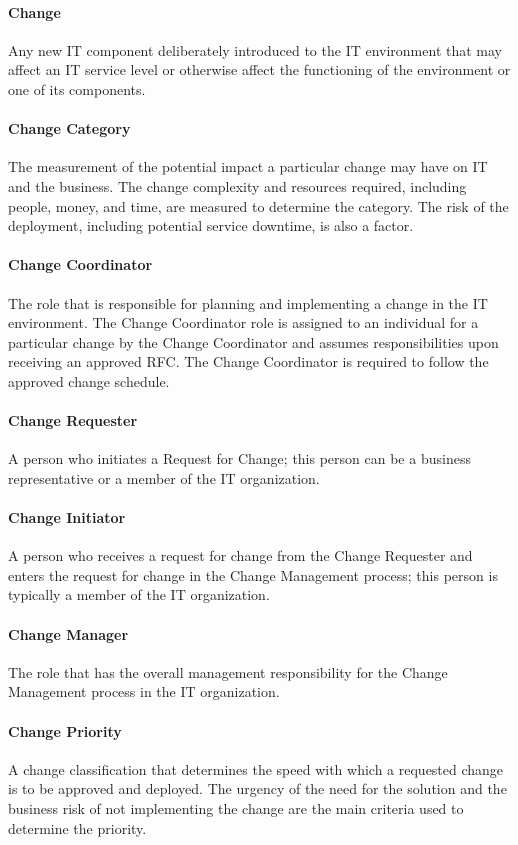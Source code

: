 \documentclass[8pt]{extarticle}
\begin{document}
\begin{multicols}{3}
    \paragraph{Change} Any new IT component deliberately introduced to the IT environment that may affect an IT
    service level or otherwise affect the functioning of the environment or one of its components.
    \paragraph{Change Category} The measurement of the potential impact a particular change may have on IT and the
    business. The change complexity and resources required, including people, money, and time, are
    measured to determine the category. The risk of the deployment, including potential service downtime, is
    also a factor.
    \paragraph{Change Coordinator} The role that is responsible for planning and implementing a change in the IT
    environment. The Change Coordinator role is assigned to an individual for a particular change by the
    Change Coordinator and assumes responsibilities upon receiving an approved RFC. The Change
    Coordinator is required to follow the approved change schedule.
    \paragraph{Change Requester} A person who initiates a Request for Change; this person can be a business
    representative or a member of the IT organization.
    \paragraph{Change Initiator} A person who receives a request for change from the Change Requester and enters
    the request for change in the Change Management process; this person is typically a member of the IT
    organization.
    \paragraph{Change Manager} The role that has the overall management responsibility for the Change Management
    process in the IT organization.
    \paragraph{Change Priority} A change classification that determines the speed with which a requested change is to
    be approved and deployed. The urgency of the need for the solution and the business risk of not
    implementing the change are the main criteria used to determine the priority.

\end{multicols}
\end{document}
